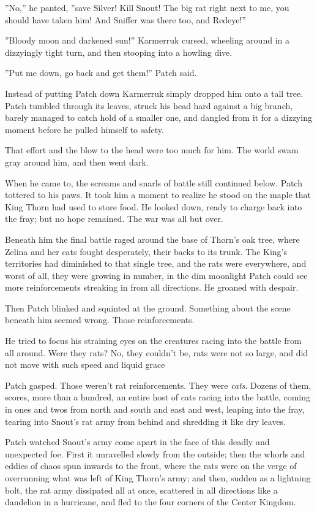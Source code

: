 \documentclass[11pt]{article}
\begin{document}
 ''No,'' he panted, ''save Silver! Kill Snout! The big rat right next to me, you should have taken him! And Sniffer was there too, and Redeye!''\par
 ''Bloody moon and darkened sun!'' Karmerruk cursed, wheeling around in a dizzyingly tight turn, and then stooping into a howling dive.\par
 ''Put me down, go back and get them!'' Patch said.\par
 Instead of putting Patch down Karmerruk simply dropped him onto a tall tree. Patch tumbled through its leaves, struck his head hard against a big branch, barely managed to catch hold of a smaller one, and dangled from it for a dizzying moment before he pulled himself to safety.\par
That effort and the blow to the head were too much for him. The world swam gray around him, and then went dark.\par
 When he came to, the screams and snarls of battle still continued below. Patch tottered to his paws. It took him a moment to realize he stood on the maple that King Thorn had used to store food. He looked down, ready to charge back into the fray; but no hope remained. The war was all but over.\par
 Beneath him the final battle raged around the base of Thorn's oak tree, where Zelina and her cats fought desperately, their backs to its trunk. The King's territories had diminished to that single tree, and the rats were everywhere, and worst of all, they were growing in number, in the dim moonlight Patch could see more reinforcements streaking in from all directions. He groaned with despair.\par
 Then Patch blinked and squinted at the ground. Something about the scene beneath him seemed wrong. Those reinforcements.\par
He tried to focus his straining eyes on the creatures racing into the battle from all around. Were they rats? No, they couldn't be, rats were not so large, and did not move with such speed and liquid grace %
\par
Patch gasped. Those weren't rat reinforcements. They were {\it cats}. Dozens of them, scores, more than a hundred, an entire host of cats racing into the battle, coming in ones and twos from north and south and east and west, leaping into the fray, tearing into Snout's rat army from behind and shredding it like dry leaves.\par
Patch watched Snout's army come apart in the face of this deadly and unexpected foe. First it unravelled slowly from the outside; then the whorls and eddies of chaos spun inwards to the front, where the rats were on the verge of overrunning what was left of King Thorn's army; and then, sudden as a lightning bolt, the rat army dissipated all at once, scattered in all directions like a dandelion in a hurricane, and fled to the four corners of the Center Kingdom.\par
\end{document}
